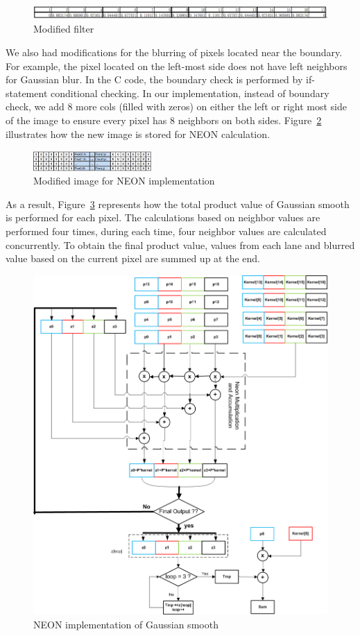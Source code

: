 \begin{figure}
\centering
\includegraphics[width=\linewidth]{drawings/filter}
\caption{Modified filter}
\label{fig:newfilter}
\end{figure}

We also had modifications for the blurring of pixels located near the boundary. For example, the pixel located on the left-most side does not have left neighbors for Gaussian blur. In the C code, the boundary check is performed by if-statement conditional checking. In our implementation, instead of boundary check, we add 8 more cols (filled with zeros) on either the left or right most side of the image to ensure every pixel has 8 neighbors on both sides. Figure~\ref{fig:addcols} illustrates how the new image is stored for NEON calculation. 

\begin{figure}
\centering
\includegraphics[width=0.4\textwidth]{drawings/new_cols}
\caption{Modified image for NEON implementation}
\label{fig:addcols}
\end{figure}

As a result, Figure~\ref{fig:neon} represents how the total product value of Gaussian smooth is performed for each pixel. The calculations based on neighbor values are performed four times, during each time, four neighbor values are calculated concurrently. To obtain the final product value, values from each lane and blurred value based on the current pixel are summed up at the end.

\begin{figure}
\centering
\includegraphics[width=0.6\linewidth]{drawings/neon}
\caption{NEON implementation of Gaussian smooth}
\label{fig:neon}
\end{figure}
